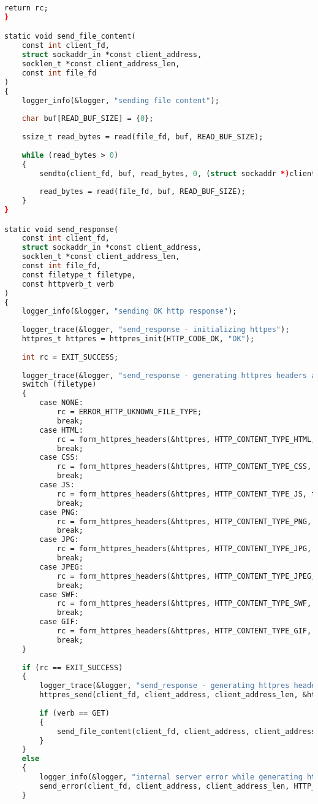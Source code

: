 \begin{lstlisting}[label=server_code,caption=Реализация статического веб-сервера,language=Caml]
	return rc;
}

static void send_file_content(
	const int client_fd,
	struct sockaddr_in *const client_address,
	socklen_t *const client_address_len,
	const int file_fd
)
{
	logger_info(&logger, "sending file content");
	
	char buf[READ_BUF_SIZE] = {0};
	
	ssize_t read_bytes = read(file_fd, buf, READ_BUF_SIZE);
	
	while (read_bytes > 0)
	{
		sendto(client_fd, buf, read_bytes, 0, (struct sockaddr *)client_address, *client_address_len);
		
		read_bytes = read(file_fd, buf, READ_BUF_SIZE);
	}
}

static void send_response(
	const int client_fd,
	struct sockaddr_in *const client_address,
	socklen_t *const client_address_len,
	const int file_fd,
	const filetype_t filetype,
	const httpverb_t verb
)
{
	logger_info(&logger, "sending OK http response");
	
	logger_trace(&logger, "send_response - initializing httpes");
	httpres_t httpres = httpres_init(HTTP_CODE_OK, "OK");
	
	int rc = EXIT_SUCCESS;
	
	logger_trace(&logger, "send_response - generating httpres headers according to file type");
	switch (filetype)
	{
		case NONE:
			rc = ERROR_HTTP_UKNOWN_FILE_TYPE;
			break;
		case HTML:
			rc = form_httpres_headers(&httpres, HTTP_CONTENT_TYPE_HTML, file_fd);
			break;
		case CSS:
			rc = form_httpres_headers(&httpres, HTTP_CONTENT_TYPE_CSS, file_fd);
			break;
		case JS:
			rc = form_httpres_headers(&httpres, HTTP_CONTENT_TYPE_JS, file_fd);
			break;
		case PNG:
			rc = form_httpres_headers(&httpres, HTTP_CONTENT_TYPE_PNG, file_fd);
			break;
		case JPG:
			rc = form_httpres_headers(&httpres, HTTP_CONTENT_TYPE_JPG, file_fd);
			break;
		case JPEG:
			rc = form_httpres_headers(&httpres, HTTP_CONTENT_TYPE_JPEG, file_fd);
			break;
		case SWF:
			rc = form_httpres_headers(&httpres, HTTP_CONTENT_TYPE_SWF, file_fd);
			break;
		case GIF:
			rc = form_httpres_headers(&httpres, HTTP_CONTENT_TYPE_GIF, file_fd);
			break;
	}
	
	if (rc == EXIT_SUCCESS)
	{
		logger_trace(&logger, "send_response - generating httpres headers according to file type");
		httpres_send(client_fd, client_address, client_address_len, &httpres);
		
		if (verb == GET)
		{
			send_file_content(client_fd, client_address, client_address_len, file_fd);
		}
	}
	else
	{
		logger_info(&logger, "internal server error while generating httpres headers");
		send_error(client_fd, client_address, client_address_len, HTTP_CODE_INTERNAL_SERVER_ERROR, "Internal server error");
	}
	

\end{lstlisting}
